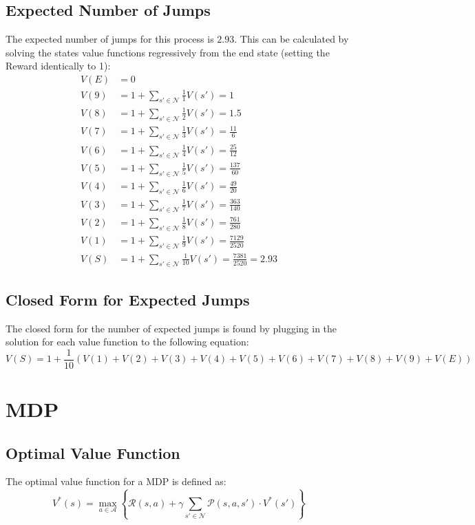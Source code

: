 \documentclass[11pt]{article}
\begin{document}
\subsection{Expected Number of Jumps}
The expected number of jumps for this process is $2.93$. This can be calculated by solving the states value functions regressively from the end state (setting the Reward identically to 1):
\begin{align}
    V(E) &= 0\\
    V(9) &= 1 + \sum_{s'\in\mathcal{N}} \frac{1}{1} V(s') = 1\\
    V(8) &= 1 + \sum_{s'\in\mathcal{N}} \frac{1}{2} V(s') = 1.5\\
    V(7) &= 1 + \sum_{s'\in\mathcal{N}} \frac{1}{3} V(s') = \frac{11}{6}\\
    V(6) &= 1 + \sum_{s'\in\mathcal{N}} \frac{1}{4} V(s') = \frac{25}{12}\\
    V(5) &= 1 + \sum_{s'\in\mathcal{N}} \frac{1}{5} V(s') = \frac{137}{60}\\
    V(4) &= 1 + \sum_{s'\in\mathcal{N}} \frac{1}{6} V(s') = \frac{49}{20}\\
    V(3) &= 1 + \sum_{s'\in\mathcal{N}} \frac{1}{7} V(s') = \frac{363}{140}\\
    V(2) &= 1 + \sum_{s'\in\mathcal{N}} \frac{1}{8} V(s') = \frac{761}{280}\\
    V(1) &= 1 + \sum_{s'\in\mathcal{N}} \frac{1}{9} V(s') = \frac{7129}{2520}\\
    V(S) &= 1 + \sum_{s'\in\mathcal{N}} \frac{1}{10} V(s') = \frac{7381}{2520} = 2.93
\end{align}

\subsection{Closed Form for Expected Jumps}
The closed form for the number of expected jumps is found by plugging in the solution for each value function to the following equation:
$$
V(S) = 1 + \frac{1}{10}\left(V(1) + V(2) + V(3) + V(4) + V(5) + V(6) + V(7) + V(8) + V(9) + V(E) \right)
$$

\newpage
\section{MDP}
\subsection{Optimal Value Function}
The optimal value function for a MDP is defined as:
$$
V^*(s) = \max_{a\in\mathcal{A}} \left\{\mathcal{R}(s, a) + \gamma\sum_{s'\in\mathcal{N}}\mathcal{P}(s, a, s')\cdot V^*(s') \right\}
$$
\end{document}
